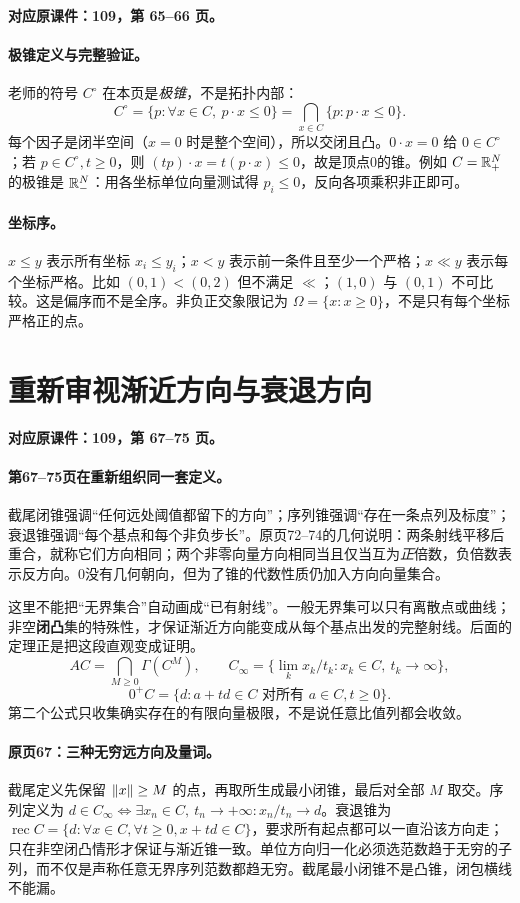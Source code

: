 \textbf{对应原课件：109，第 65--66 页。}


\paragraph{极锥定义与完整验证。}
老师的符号 $C^\circ$ 在本页是\emph{极锥}，不是拓扑内部：
\[C^\circ=\{p:\forall x\in C,\ p\cdot x\le0\}
=\bigcap_{x\in C}\{p:p\cdot x\le0\}.
\]
每个因子是闭半空间（$x=0$ 时是整个空间），所以交闭且凸。$0\cdot x=0$ 给 $0\in C^\circ$；若 $p\in C^\circ,t\ge0$，则 $(tp)\cdot x=t(p\cdot x)\le0$，故是顶点0的锥。例如 $C=\mathbb{R}_+^N$ 的极锥是 $\mathbb{R}_-^N$：用各坐标单位向量测试得 $p_i\le0$，反向各项乘积非正即可。
\paragraph{坐标序。}
$x\le y$ 表示所有坐标 $x_i\le y_i$；$x<y$ 表示前一条件且至少一个严格；$x\ll y$ 表示每个坐标严格。比如 $(0,1)<(0,2)$ 但不满足 $\ll$；$(1,0)$ 与 $(0,1)$ 不可比较。这是偏序而不是全序。非负正交象限记为 $\Omega=\{x:x\ge0\}$，不是只有每个坐标严格正的点。


\clearpage\section{重新审视渐近方向与衰退方向}\label{g:109:67}

\textbf{对应原课件：109，第 67--75 页。}


\paragraph{第67--75页在重新组织同一套定义。}
截尾闭锥强调“任何远处阈值都留下的方向”；序列锥强调“存在一条点列及标度”；衰退锥强调“每个基点和每个非负步长”。原页72--74的几何说明：两条射线平移后重合，就称它们方向相同；两个非零向量方向相同当且仅当互为\emph{正}倍数，负倍数表示反方向。0没有几何朝向，但为了锥的代数性质仍加入方向向量集合。

这里不能把“无界集合”自动画成“已有射线”。一般无界集可以只有离散点或曲线；非空\textbf{闭凸}集的特殊性，才保证渐近方向能变成从每个基点出发的完整射线。后面的定理正是把这段直观变成证明。
\[
AC=\bigcap_{M\ge0}\Gamma(C^M),\qquad
C_\infty=\{\lim_k x_k/t_k:x_k\in C,\ t_k\to\infty\},
\]
\[0^+C=\{d:a+td\in C\text{ 对所有 }a\in C,t\ge0\}.
\]
第二个公式只收集确实存在的有限向量极限，不是说任意比值列都会收敛。


\paragraph{原页67：三种无穷远方向及量词。}截尾定义先保留 $\left\lVert x\right\rVert\ge M$ 的点，再取所生成最小闭锥，最后对全部 $M$ 取交。序列定义为 $d\in C_\infty\iff\exists x_n\in C,\ t_n\to+\infty:x_n/t_n\to d$。衰退锥为 $\operatorname{rec}C=\{d:\forall x\in C,\forall t\ge0,x+td\in C\}$，要求所有起点都可以一直沿该方向走；只在非空闭凸情形才保证与渐近锥一致。单位方向归一化必须选范数趋于无穷的子列，而不仅是声称任意无界序列范数都趋无穷。截尾最小闭锥不是凸锥，闭包横线不能漏。



